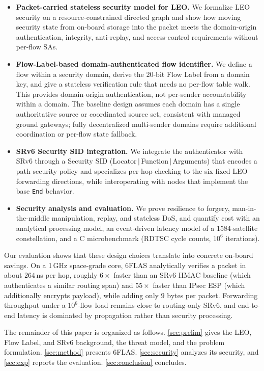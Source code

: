 \begin{itemize}

\item \textbf{Packet-carried stateless security model for LEO.}
We formalize LEO security on a resource-constrained directed graph and show how
moving security state from on-board storage into the packet meets the
domain-origin authentication, integrity, anti-replay, and access-control
requirements without per-flow SAs.

\item \textbf{Flow-Label-based domain-authenticated flow identifier.}
We define a flow within a security domain, derive the
20-bit Flow Label from a domain key, and give a stateless verification rule that
needs no per-flow table walk. This provides domain-origin authentication, not per-sender accountability within a domain. The baseline design assumes each domain has a single authoritative source or coordinated source set, consistent with managed ground gateways; fully decentralized multi-sender domains require additional coordination or per-flow state fallback.

\item \textbf{SRv6 Security SID integration.}
We integrate the authenticator with SRv6 through a Security SID
(Locator$\,|\,$Function$\,|\,$Arguments) that encodes a path security policy and
specializes per-hop checking to the six fixed LEO forwarding directions, while
interoperating with nodes that implement the base \texttt{End} behavior.

\item \textbf{Security analysis and evaluation.}
We prove resilience to forgery, man-in-the-middle manipulation, replay, and
stateless DoS, and quantify cost with an analytical processing model, an
event-driven latency model of a 1584-satellite constellation, and a C microbenchmark
(RDTSC cycle counts, $10^6$ iterations).

\end{itemize}


Our evaluation shows that these design choices translate into concrete
on-board savings. On a 1\,GHz space-grade core, 6FLAS analytically
verifies a packet in about $264$\,ns per hop, roughly $6\times$ faster than
an SRv6 HMAC baseline (which authenticates a similar routing span) and $55\times$ faster than IPsec ESP (which additionally encrypts payload), while adding only
$9$ bytes per packet. Forwarding throughput under a $10^6$-flow load remains
close to routing-only SRv6, and end-to-end latency is dominated by
propagation rather than security processing.

The remainder of this paper is organized as follows.
\cref{sec:prelim} gives the LEO,
Flow Label, and SRv6 background, the threat model, and the problem
formulation. \cref{sec:method} presents 6FLAS. \cref{sec:security} analyzes its
security, and \cref{sec:exp} reports the evaluation. \cref{sec:conclusion}
concludes.
